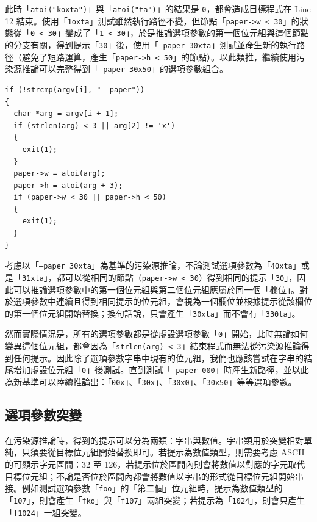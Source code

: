 此時「\texttt{atoi("koxta")}」與「\texttt{atoi("ta")}」的結果是 \texttt{0}，都會造成目標程式在 Line 12 結束。使用「\texttt{1oxta}」測試雖然執行路徑不變，但節點「\texttt{paper->w < 30}」的狀態從「\texttt{0 < 30}」變成了「\texttt{1 < 30}」，於是推論選項參數的第一個位元組與這個節點的分支有關，得到提示「\texttt{30}」後，使用「\texttt{--paper 30xta}」測試並產生新的執行路徑（避免了短路運算，產生「\texttt{paper->h < 50}」的節點）。以此類推，繼續使用污染源推論可以完整得到「\texttt{--paper 30x50}」的選項參數組合。

\vfill

\begin{lstlisting}[caption=多欄位選項參數範例, label=lst:multi-field-optarg-example]
if (!strcmp(argv[i], "--paper"))
{
  char *arg = argv[i + 1];
  if (strlen(arg) < 3 || arg[2] != 'x')
  {
    exit(1);
  }
  paper->w = atoi(arg);
  paper->h = atoi(arg + 3);
  if (paper->w < 30 || paper->h < 50)
  {
    exit(1);
  }
}
\end{lstlisting}

考慮以「\texttt{--paper 30xta}」為基準的污染源推論，不論測試選項參數為「\texttt{40xta}」或是「\texttt{31xta}」，都可以從相同的節點（\texttt{paper->w < 30}）得到相同的提示「\texttt{30}」，因此可以推論選項參數中的第一個位元組與第二個位元組應屬於同一個「欄位」。對於選項參數中連續且得到相同提示的位元組，會視為一個欄位並根據提示從該欄位的第一個位元組開始替換；換句話說，只會產生「\texttt{30xta}」而不會有「\texttt{330ta}」。

然而實際情況是，所有的選項參數都是從虛設選項參數「\texttt{0}」開始，此時無論如何變異這個位元組，都會因為「\texttt{strlen(arg) < 3}」結束程式而無法從污染源推論得到任何提示。因此除了選項參數字串中現有的位元組，我們也應該嘗試在字串的結尾增加虛設位元組「\texttt{0}」後測試。直到測試「\texttt{--paper 000}」時產生新路徑，並以此為新基準可以陸續推論出：「\texttt{00x}」、「\texttt{30x}」、「\texttt{30x0}」、「\texttt{30x50}」等等選項參數。

\subsection{選項參數突變}

在污染源推論時，得到的提示可以分為兩類：字串與數值。字串類用於突變相對單純，只須要從目標位元組開始替換即可。若提示為數值類型，則需要考慮 ASCII 的可顯示字元區間：32 至 126，若提示位於區間內則會將數值以對應的字元取代目標位元組；不論是否位於區間內都會將數值以字串的形式從目標位元組開始串接。例如測試選項參數「\texttt{foo}」的「第二個」位元組時，提示為數值類型的「\texttt{107}」，則會產生「\texttt{fko}」與「\texttt{f107}」兩組突變；若提示為「\texttt{1024}」，則會只產生「\texttt{f1024}」一組突變。

